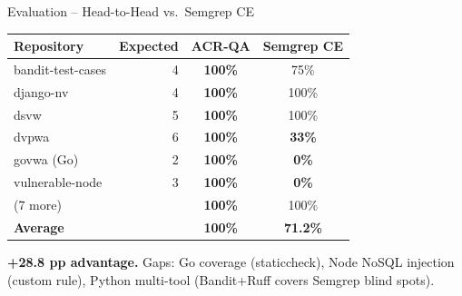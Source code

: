 \documentclass[aspectratio=169,12pt]{beamer}
\newcommand{\bad}[1]{\textbf{\color{acrRed}#1}}
\newcommand{\good}[1]{\textbf{\color{acrGreen}#1}}
\begin{document}
\begin{frame}{Evaluation -- Head-to-Head vs.\ Semgrep CE}
  \begin{center}
  \begin{tabular}{lrcc}
    \toprule
    Repository & Expected & \textbf{ACR-QA} & Semgrep CE \\
    \midrule
    bandit-test-cases & 4 & \good{100\%} & 75\% \\
    django-nv         & 4 & \good{100\%} & 100\% \\
    dsvw              & 5 & \good{100\%} & 100\% \\
    dvpwa             & 6 & \good{100\%} & \bad{33\%} \\
    govwa (Go)        & 2 & \good{100\%} & \bad{0\%} \\
    vulnerable-node   & 3 & \good{100\%} & \bad{0\%} \\
    (7 more) & & \good{100\%} & 100\% \\
    \midrule
    \textbf{Average}  &   & \good{\textbf{100\%}} & \bad{\textbf{71.2\%}} \\
    \bottomrule
  \end{tabular}
  \end{center}
  \vspace{4pt}
  \small \textbf{+28.8 pp advantage.}
  Gaps: Go coverage (staticcheck), Node NoSQL injection (custom rule), Python multi-tool (Bandit+Ruff covers Semgrep blind spots).
\end{frame}
\end{document}
